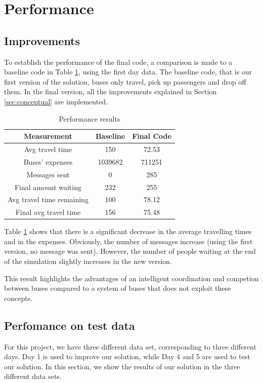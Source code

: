 \section{Performance}
\subsection{Improvements}
To establish the performance of the final code, a comparison is made to a baseline code in Table \ref{table:table1}, using the first day data. The baseline code, that is our first version of the solution, buses only travel, pick up passengers and drop off them. In the final version, all the improvements explained in Section \ref{sec:conceptual} are implemented.

\begin{table}[htbp]
\centering
\begin{tabular}{ |c|c|c|  }
 \hline
  Measurement & Baseline & Final Code \\
 \hline
  Avg travel time & 150 & 72.53 \\
  Buses' expenses & 1039682 & 711251 \\
  Messages sent & 0 & 285  \\
  Final amount waiting & 232 & 255 \\
  Avg travel time remaining & 100 & 78.12 \\
  Final avg travel time & 156 & 75.48 \\
 \hline
\end{tabular}
\label{table:table1}
\caption{Performance results}
\end{table}

Table \ref{table:table1} shows that there is a significant decrease in the average travelling times and in the expenses. Obviously, the number of messages increase (using the first version, no message was sent). However, the number of people waiting at the end of the simulation slightly increases in the new version.

This result highlights the advantages of an intelligent coordination and competion between buses compared to a system of buses that does not exploit these concepts.

\subsection{Perfomance on test data}

For this project, we have three different data set, corresponding to three different days. Day 1 is used to improve our solution, while Day 4 and 5 are used to test our solution. In this section, we show the results of our solution in the three different data sets.

